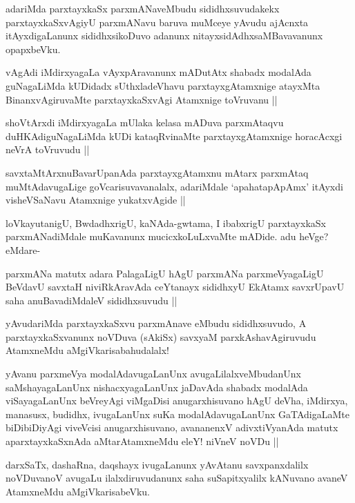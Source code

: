 \begin{artha}
adariMda parxtayxkaSx parxmANaveMbudu sididhxsuvudakekx parxtayxkaSxvAgiyU parxmANavu baruva muMceye yAvudu ajAcnxta itAyxdigaLanunx sididhxsikoDuvo adanunx nitayxsidAdhxsaMBavavanunx  opapxbeVku.
\end{artha}

\begin{artha}
vAgAdi iMdirxyagaLa vAyxpAravanunx mADutAtx shabadx modalAda guNagaLiMda kUDidadx sUthxladeVhavu parxtayxgAtamxnige atayxMta BinanxvAgiruvaMte parxtayxkaSxvAgi Atamxnige toVruvanu ||
\end{artha}

\begin{artha}
shoVtArxdi iMdirxyagaLa mUlaka kelasa mADuva parxmAtaqvu duHKAdiguNagaLiMda kUDi kataqRvinaMte parxtayxgAtamxnige horacAcxgi neVrA toVruvudu ||
\end{artha}

\begin{artha}
savxtaMtArxnuBavarUpanAda parxtayxgAtamxnu mAtarx parxmAtaq muMtAdavugaLige goVcarisuvavanalalx, adariMdale `apahatapApAmx' itAyxdi visheVSaNavu Atamxnige yukatxvAgide ||
\end{artha}

\begin{artha}
loVkayutanigU, BwdadhxrigU, kaNAda-gwtama, I ibabxrigU parxtayxkaSx parxmANadiMdale muKavanunx mucicxkoLuLxvaMte mADide. adu heVge? eMdare-
\end{artha}

\begin{artha}
parxmANa matutx adara PalagaLigU hAgU parxmANa parxmeVyagaLigU BeVdavU savxtaH niviRkAravAda ceYtanayx sididhxyU EkAtamx savxrUpavU saha anuBavadiMdaleV sididhxsuvudu ||
\end{artha}

\begin{artha}
yAvudariMda parxtayxkaSxvu parxmAnave eMbudu sididhxsuvudo, A parxtayxkaSxvanunx noVDuva (sAkiSx) savxyaM parxkAshavAgiruvudu AtamxneMdu aMgiVkarisabahudalalx!
\end{artha}

\begin{artha}
yAvanu parxmeVya modalAdavugaLanUnx avugaLilalxveMbudanUnx saMshayagaLanUnx nishacxyagaLanUnx jaDavAda shabadx modalAda viSayagaLanUnx beVreyAgi viMgaDisi anugarxhisuvano hAgU deVha, iMdirxya, manasusx, budidhx, ivugaLanUnx suKa modalAdavugaLanUnx GaTAdigaLaMte biDibiDiyAgi viveVcisi anugarxhisuvano, avananenxV adivxtiVyanAda matutx aparxtayxkaSxnAda aMtarAtamxneMdu eleY! niVneV noVDu ||
\end{artha}

\begin{artha}
darxSaTx, dashaRna, daqshayx ivugaLanunx yAvAtanu savxpanxdalilx noVDuvanoV avugaLu ilalxdiruvudanunx saha suSapitxyalilx kANuvano avaneV AtamxneMdu aMgiVkarisabeVku.
\end{artha}
